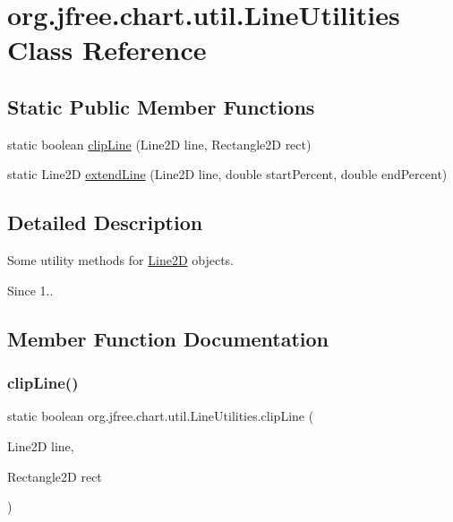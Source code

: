 \hypertarget{classorg_1_1jfree_1_1chart_1_1util_1_1_line_utilities}{}\section{org.\+jfree.\+chart.\+util.\+Line\+Utilities Class Reference}
\label{classorg_1_1jfree_1_1chart_1_1util_1_1_line_utilities}
\subsection*{Static Public Member Functions}
\begin{DoxyCompactItemize}
\item 
static boolean \mbox{\hyperlink{classorg_1_1jfree_1_1chart_1_1util_1_1_line_utilities_abbfa009150fbb7658ccb3af2c49dfdd8}{clip\+Line}} (Line2D line, Rectangle2D rect)
\item 
static Line2D \mbox{\hyperlink{classorg_1_1jfree_1_1chart_1_1util_1_1_line_utilities_a516c7616e614d0eee1bd3d19b2f867cf}{extend\+Line}} (Line2D line, double start\+Percent, double end\+Percent)
\end{DoxyCompactItemize}


\subsection{Detailed Description}
Some utility methods for \mbox{\hyperlink{}{Line2D}} objects.

\begin{DoxySince}{Since}
1.. 
\end{DoxySince}


\subsection{Member Function Documentation}
\mbox{\label{classorg_1_1jfree_1_1chart_1_1util_1_1_line_utilities_abbfa009150fbb7658ccb3af2c49dfdd8}} 
\subsubsection{\texorpdfstring{clip\+Line()}{clipLine()}}
{\footnotesize\ttfamily static boolean org.\+jfree.\+chart.\+util.\+Line\+Utilities.\+clip\+Line (\begin{DoxyParamCaption}\item[{Line2D}]{line,  }\item[{Rectangle2D}]{rect }\end{DoxyParamCaption})\hspace{0.3cm}{\ttfamily [static]}}

